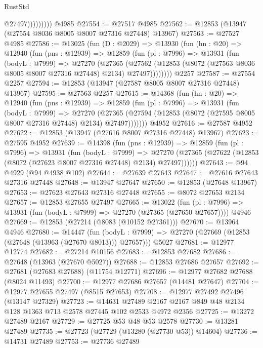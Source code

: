 \begin{lexlean}{RustStd}
\begin{coremodule}
                      @27497)))))))))
    @4985
@27554 := @27517 @4985
@27562 := @12853 (@13947 (@27554 @8036 @8005 @8007 @27316 @27448) @13967)
@27563 := @27527 @4985
@27586 := @13025
    (fun (D : @2029) =>
    @13930
      (fun (hn : @20) =>
      @12940
        (fun (pns : @12939) =>
        @12859
          (fun (pl : @7996) =>
          @13931
            (fun (bodyL : @7999) =>
            @27270
              (@27365
                (@27562
                  (@12853 (@8072 (@27563 @8036 @8005 @8007 @27316 @27448) @2134) @27497))))))))
    @2257
@27587 := @27554 @2257
@27594 := @12853 (@13947 (@27587 @8005 @8007 @27316 @27448) @13967)
@27595 := @27563 @2257
@27615 := @14368
    (fun (hn : @20) =>
    @12940
      (fun (pns : @12939) =>
      @12859
        (fun (pl : @7996) =>
        @13931
          (fun (bodyL : @7999) =>
          @27270
            (@27365 (@27594 (@12853 (@8072 (@27595 @8005 @8007 @27316 @27448) @2134) @27497)))))))
    @4952
@27616 := @27587 @4952
@27622 := @12853 (@13947 (@27616 @8007 @27316 @27448) @13967)
@27623 := @27595 @4952
@27639 := @14398
    (fun (pns : @12939) =>
    @12859
      (fun (pl : @7996) =>
      @13931
        (fun (bodyL : @7999) =>
        @27270 (@27365 (@27622 (@12853 (@8072 (@27623 @8007 @27316 @27448) @2134) @27497))))))
@27643 := @94 @4929 (@94 @4938 @102)
@27644 := @27639 @27643
@27647 := @27616 @27643 @27316 @27448
@27648 := @13947 @27647
@27650 := @12853 (@27648 @13967)
@27653 := @27623 @27643 @27316 @27448
@27655 := @8072 @27653 @2134
@27657 := @12853 @27655 @27497
@27665 := @13022
    (fun (pl : @7996) => @13931 (fun (bodyL : @7999) => @27270 (@27365 (@27650 @27657))))
    @4946
@27669 := @12853 (@27214 (@8083 (@10152 @27361)))
@27670 := @13964 @4946
@27680 := @14447
    (fun (bodyL : @7999) => @27270 (@27669 (@12853 (@27648 (@13963 (@27670 @8013))) @27657)))
    @5027
@27681 := @12977 @12774
@27682 := @27214 @10156
@27683 := @12853 @27682
@27686 := @27648 (@13963 (@27670 @5027))
@27688 := @12853 @27686 @27657
@27692 := @27681 (@27683 @27688) (@11754 @12771)
@27696 := @12977 @27682 @27688 (@8024 @11493)
@27700 := @12977 @27686 @27657 (@14481 @27647)
@27704 := @12977 @27655 @27497 (@8515 @27653)
@27708 := @12977 @27492 @27496 (@13147 @27329)
@27723 := @14631
    @27489
    @2167
    @2167
    @849
    @48
    @2134
    @128
    @1363
    @713
    @2578
    @27445
    @102
    @2533
    @4972
    @2356
@27725 := @13272 @27489 @2167
@27729 := @27725 @53 @48 @53 @2578
@27730 := @13281 @27489
@27735 := @27723 (@27729 (@13280 (@27730 @53)) @14604)
@27736 := @14731 @27489
@27753 := @27736
    @27489

\end{coremodule}
\end{lexlean}
